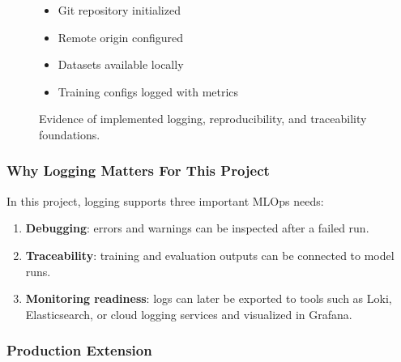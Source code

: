 \documentclass[11pt,a4paper]{article}
\begin{document}
\begin{figure}[H]
\begin{tcolorbox}
        \hfill
        \begin{minipage}[t]{0.30\textwidth}
            \begin{tcolorbox}[
                enhanced,
                height=5.6cm,
                colback=white,
                colframe=navy,
                coltitle=navy,
                fonttitle=\bfseries,
                title=Traceability,
                arc=2mm,
                boxrule=0.8pt,
                left=3mm,
                right=3mm,
                top=2mm,
                bottom=2mm
            ]
                \small\raggedright
                \begin{itemize}[leftmargin=1em,itemsep=0.35em]
                    \item Git repository initialized
                    \item Remote origin configured
                    \item Datasets available locally
                    \item Training configs logged with metrics
                \end{itemize}
            \end{tcolorbox}
        \end{minipage}
    \end{tcolorbox}
    \caption{Evidence of implemented logging, reproducibility, and traceability foundations.}
    \label{fig:foundations}
\end{figure}

\subsubsection{Why Logging Matters For This Project}

In this project, logging supports three important MLOps needs:

\begin{enumerate}
    \item \textbf{Debugging}: errors and warnings can be inspected after a failed run.
    \item \textbf{Traceability}: training and evaluation outputs can be connected to model runs.
    \item \textbf{Monitoring readiness}: logs can later be exported to tools such as Loki, Elasticsearch, or cloud logging services and visualized in Grafana.
\end{enumerate}

\subsubsection{Production Extension}
\end{document}
